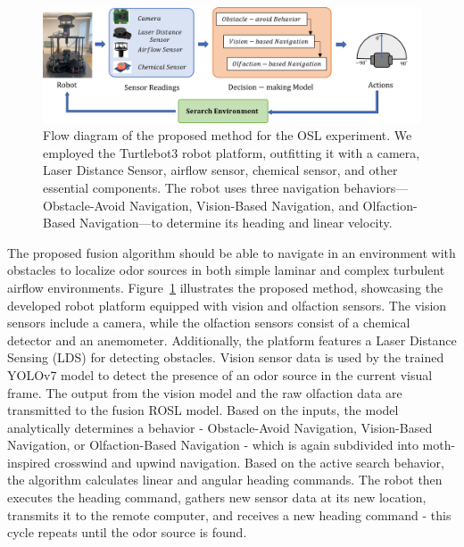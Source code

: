 \begin{figure}[h] %

\ \\
\vspace*{-.18in}

\begin{center}
\includegraphics[width=0.7\columnwidth]{Main/Figure/OSL Model.png}\hspace*{0.04in}
\end{center}
\vspace{-.1in}

\caption
{Flow diagram of the proposed method for the OSL experiment. We employed the Turtlebot3 robot platform, outfitting it with a camera, Laser Distance Sensor, airflow sensor, chemical sensor, and other essential components. The robot uses three navigation behaviors—Obstacle-Avoid Navigation, Vision-Based Navigation, and Olfaction-Based Navigation—to determine its heading and linear velocity.}
\label{fig:osl_model}
\end{figure}

The proposed fusion algorithm should be able to navigate in an environment with obstacles to localize odor sources in both simple laminar and complex turbulent airflow environments. Figure~\ref{fig:osl_model} illustrates the proposed method, showcasing the developed robot platform equipped with vision and olfaction sensors. The vision sensors include a camera, while the olfaction sensors consist of a chemical detector and an anemometer. Additionally, the platform features a Laser Distance Sensing (LDS) for detecting obstacles. Vision sensor data is used by the trained YOLOv7 model to detect the presence of an odor source in the current visual frame. The output from the vision model and the raw olfaction data are transmitted to the fusion ROSL model. Based on the inputs, the model analytically determines a behavior - Obstacle-Avoid Navigation, Vision-Based Navigation, or Olfaction-Based Navigation - which is again subdivided into moth-inspired crosswind and upwind navigation. Based on the active search behavior, the algorithm calculates linear and angular heading commands. The robot then executes the heading command, gathers new sensor data at its new location, transmits it to the remote computer, and receives a new heading command - this cycle repeats until the odor source is found.

